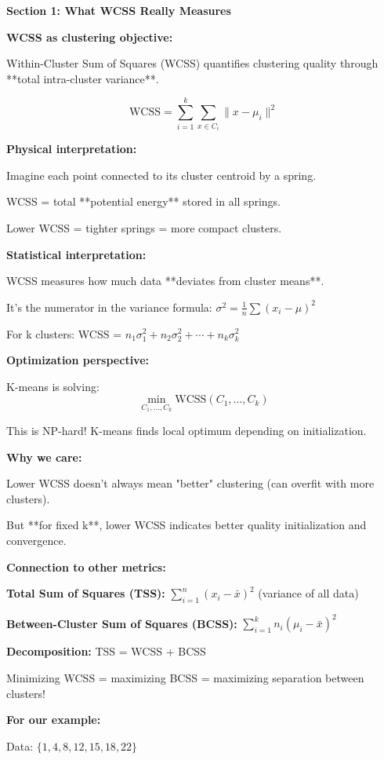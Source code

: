 \documentclass[12pt]{article}
\begin{document}
\begin{explanation}
\textbf{Section 1: What WCSS Really Measures}

\textbf{WCSS as clustering objective:}

Within-Cluster Sum of Squares (WCSS) quantifies clustering quality through **total intra-cluster variance**.

\[
\text{WCSS} = \sum_{i=1}^k \sum_{x \in C_i} \|x - \mu_i\|^2
\]

\textbf{Physical interpretation:}

Imagine each point connected to its cluster centroid by a spring.

WCSS = total **potential energy** stored in all springs.

Lower WCSS = tighter springs = more compact clusters.

\textbf{Statistical interpretation:}

WCSS measures how much data **deviates from cluster means**.

It's the numerator in the variance formula: $\sigma^2 = \frac{1}{n}\sum(x_i - \mu)^2$

For k clusters: WCSS = $n_1\sigma_1^2 + n_2\sigma_2^2 + \cdots + n_k\sigma_k^2$

\textbf{Optimization perspective:}

K-means is solving:
\[
\min_{C_1, \ldots, C_k} \text{WCSS}(C_1, \ldots, C_k)
\]

This is NP-hard! K-means finds local optimum depending on initialization.

\textbf{Why we care:}

Lower WCSS doesn't always mean "better" clustering (can overfit with more clusters).

But **for fixed k**, lower WCSS indicates better quality initialization and convergence.

\textbf{Connection to other metrics:}

\textbf{Total Sum of Squares (TSS):} $\sum_{i=1}^n (x_i - \bar{x})^2$ (variance of all data)

\textbf{Between-Cluster Sum of Squares (BCSS):} $\sum_{i=1}^k n_i(\mu_i - \bar{x})^2$

\textbf{Decomposition:} TSS = WCSS + BCSS

Minimizing WCSS = maximizing BCSS = maximizing separation between clusters!

\textbf{For our example:}

Data: $\{1, 4, 8, 12, 15, 18, 22\}$


\end{explanation}
\end{document}
